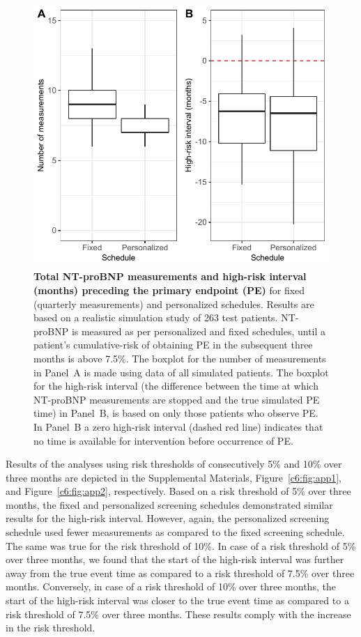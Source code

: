 \begin{figure}
\includegraphics{contents/c6/images/c6_fig2.pdf}
\caption{\textbf{Total NT-proBNP measurements and high-risk interval (months) preceding the primary endpoint (PE)} for fixed (quarterly measurements) and personalized schedules. Results are based on a realistic simulation study of 263 test patients. NT-proBNP is measured as per personalized and fixed schedules, until a patient's cumulative-risk of obtaining PE in the subsequent three months is above 7.5\%. The boxplot for the number of measurements in Panel~A is made using data of all simulated patients. The boxplot for the high-risk interval (the difference between the time at which NT-proBNP measurements are stopped and the true simulated PE time) in Panel~B, is based on only those patients who observe PE. In Panel~B a zero high-risk interval (dashed red line) indicates that no time is available for intervention before occurrence of PE.}
\label{c6:fig:2}
\end{figure}

Results of the analyses using risk thresholds of consecutively 5\% and 10\% over three months are depicted in the Supplemental Materials, Figure~\ref{c6:fig:app1}, and Figure~\ref{c6:fig:app2}, respectively. Based on a risk threshold of 5\% over three months, the fixed and personalized screening schedules demonstrated similar results for the high-risk interval. However, again, the personalized screening schedule used fewer measurements as compared to the fixed screening schedule. The same was true for the risk threshold of 10\%. In case of a risk threshold of 5\% over three months, we found that the start of the high-risk interval was further away from the true event time as compared to a risk threshold of 7.5\% over three months. Conversely, in case of a risk threshold of 10\% over three months, the start of the high-risk interval was closer to the true event time as compared to a risk threshold of 7.5\% over three months. These results comply with the increase in the risk threshold.